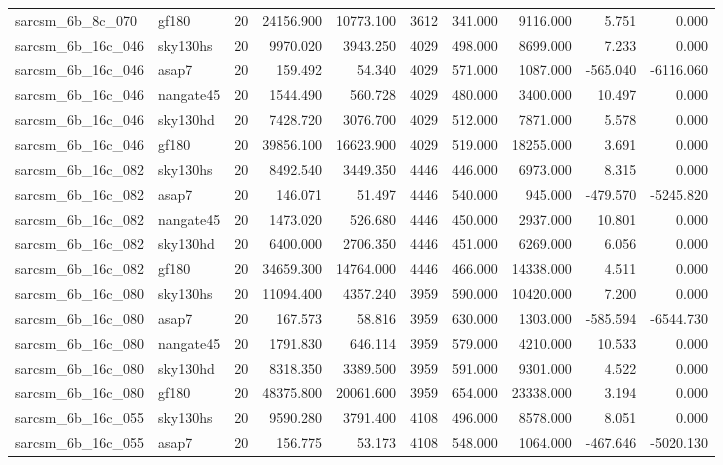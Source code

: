 \begin{longtable}{llrrrrrrrr}
sarcsm\_6b\_8c\_070 & gf180 & 20 & 24156.900 & 10773.100 & 3612 & 341.000 & 9116.000 & 5.751 & 0.000 \\
sarcsm\_6b\_16c\_046 & sky130hs & 20 & 9970.020 & 3943.250 & 4029 & 498.000 & 8699.000 & 7.233 & 0.000 \\
sarcsm\_6b\_16c\_046 & asap7 & 20 & 159.492 & 54.340 & 4029 & 571.000 & 1087.000 & -565.040 & -6116.060 \\
sarcsm\_6b\_16c\_046 & nangate45 & 20 & 1544.490 & 560.728 & 4029 & 480.000 & 3400.000 & 10.497 & 0.000 \\
sarcsm\_6b\_16c\_046 & sky130hd & 20 & 7428.720 & 3076.700 & 4029 & 512.000 & 7871.000 & 5.578 & 0.000 \\
sarcsm\_6b\_16c\_046 & gf180 & 20 & 39856.100 & 16623.900 & 4029 & 519.000 & 18255.000 & 3.691 & 0.000 \\
sarcsm\_6b\_16c\_082 & sky130hs & 20 & 8492.540 & 3449.350 & 4446 & 446.000 & 6973.000 & 8.315 & 0.000 \\
sarcsm\_6b\_16c\_082 & asap7 & 20 & 146.071 & 51.497 & 4446 & 540.000 & 945.000 & -479.570 & -5245.820 \\
sarcsm\_6b\_16c\_082 & nangate45 & 20 & 1473.020 & 526.680 & 4446 & 450.000 & 2937.000 & 10.801 & 0.000 \\
sarcsm\_6b\_16c\_082 & sky130hd & 20 & 6400.000 & 2706.350 & 4446 & 451.000 & 6269.000 & 6.056 & 0.000 \\
sarcsm\_6b\_16c\_082 & gf180 & 20 & 34659.300 & 14764.000 & 4446 & 466.000 & 14338.000 & 4.511 & 0.000 \\
sarcsm\_6b\_16c\_080 & sky130hs & 20 & 11094.400 & 4357.240 & 3959 & 590.000 & 10420.000 & 7.200 & 0.000 \\
sarcsm\_6b\_16c\_080 & asap7 & 20 & 167.573 & 58.816 & 3959 & 630.000 & 1303.000 & -585.594 & -6544.730 \\
sarcsm\_6b\_16c\_080 & nangate45 & 20 & 1791.830 & 646.114 & 3959 & 579.000 & 4210.000 & 10.533 & 0.000 \\
sarcsm\_6b\_16c\_080 & sky130hd & 20 & 8318.350 & 3389.500 & 3959 & 591.000 & 9301.000 & 4.522 & 0.000 \\
sarcsm\_6b\_16c\_080 & gf180 & 20 & 48375.800 & 20061.600 & 3959 & 654.000 & 23338.000 & 3.194 & 0.000 \\
sarcsm\_6b\_16c\_055 & sky130hs & 20 & 9590.280 & 3791.400 & 4108 & 496.000 & 8578.000 & 8.051 & 0.000 \\
sarcsm\_6b\_16c\_055 & asap7 & 20 & 156.775 & 53.173 & 4108 & 548.000 & 1064.000 & -467.646 & -5020.130 \\

\end{longtable}
